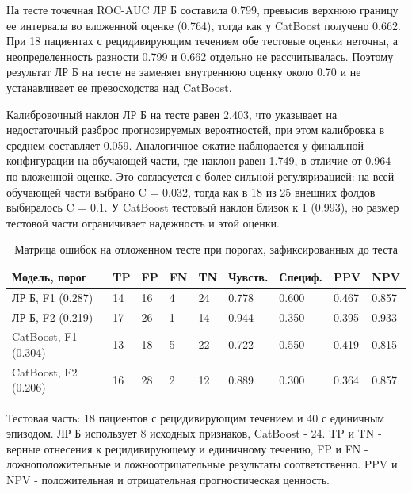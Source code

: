 \documentclass{crm-article}
\begin{document}
На тесте точечная ROC-AUC ЛР Б составила 0.799, превысив верхнюю границу ее интервала во вложенной оценке (0.764), тогда как у CatBoost получено 0.662. При 18 пациентах с рецидивирующим течением обе тестовые оценки неточны, а неопределенность разности 0.799 и 0.662 отдельно не рассчитывалась. Поэтому результат ЛР Б на тесте не заменяет внутреннюю оценку около 0.70 и не устанавливает ее превосходства над CatBoost.

Калибровочный наклон ЛР Б на тесте равен 2.403, что указывает на недостаточный разброс прогнозируемых вероятностей, при этом калибровка в среднем составляет 0.059. Аналогичное сжатие наблюдается у финальной конфигурации на обучающей части, где наклон равен 1.749, в отличие от 0.964 по вложенной оценке. Это согласуется с более сильной регуляризацией: на всей обучающей части выбрано C = 0.032, тогда как в 18 из 25 внешних фолдов выбиралось C = 0.1. У CatBoost тестовый наклон близок к 1 (0.993), но размер тестовой части ограничивает надежность и этой оценки.

\begin{table}[h]
\vspace*{5mm}
\caption{Матрица ошибок на отложенном тесте при порогах, зафиксированных до теста}\label{tab4}%
\setlength{\tabcolsep}{4pt}
\begin{tabularx}{\textwidth}{@{}Lllllllll@{}}
\toprule
Модель, порог & TP & FP & FN & TN & Чувств. & Специф. & PPV & NPV\\
\midrule
ЛР Б, F1 (0.287) & 14 & 16 & 4 & 24 & 0.778 & 0.600 & 0.467 & 0.857\\
ЛР Б, F2 (0.219) & 17 & 26 & 1 & 14 & 0.944 & 0.350 & 0.395 & 0.933\\
CatBoost, F1 (0.304) & 13 & 18 & 5 & 22 & 0.722 & 0.550 & 0.419 & 0.815\\
CatBoost, F2 (0.206) & 16 & 28 & 2 & 12 & 0.889 & 0.300 & 0.364 & 0.857\\
\bottomrule
\end{tabularx}
\par\smallskip
\begin{minipage}{\textwidth}\footnotesize
Тестовая часть: 18 пациентов с рецидивирующим течением и 40 с единичным эпизодом. ЛР Б использует 8 исходных признаков, CatBoost - 24. TP и TN - верные отнесения к рецидивирующему и единичному течению, FP и FN - ложноположительные и ложноотрицательные результаты соответственно. PPV и NPV - положительная и отрицательная прогностическая ценность.
\end{minipage}
\end{table}
\end{document}
